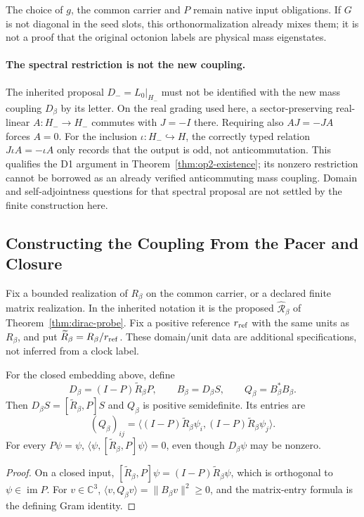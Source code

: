 The choice of $g$, the common carrier and $P$ remain native input
obligations. If $G$ is not diagonal in the seed slots, this
orthonormalization already mixes them; it is not a proof that the
original octonion labels are physical mass eigenstates.

\paragraph{The spectral restriction is not the new coupling.}
The inherited proposal $D_-=L_0|_{H_-}$ must not be identified with
the new mass coupling $D_\beta$ by its letter. On the real grading
used here, a sector-preserving real-linear $A:H_-\to H_-$ commutes
with $J=-I$ there. Requiring also $AJ=-JA$ forces $A=0$.
For the inclusion $\iota:H_-\hookrightarrow H$, the correctly typed
relation $J\iota A=-\iota A$ only records that the output is
odd, not anticommutation. This qualifies the D1 argument in
Theorem~\ref{thm:op2-existence}; its nonzero restriction cannot be
borrowed as an already verified anticommuting mass coupling.
Domain and self-adjointness questions for that spectral proposal
are not settled by the finite construction here.

\subsection{Constructing the Coupling From the Pacer and Closure}
\label{v480:generation-defect}

Fix a bounded realization of $R_\beta$ on the common carrier, or a
declared finite matrix realization. In the inherited notation it is
the proposed $\hat{\mathcal R}_\beta$ of
Theorem~\ref{thm:dirac-probe}. Fix a positive reference $r_{\rm ref}$
with the same units as $R_\beta$, and put
$\widetilde R_\beta=R_\beta/r_{\rm ref}$. These domain/unit data
are additional specifications, not inferred from a clock label.

\begin{proposition}
\label{v480:generation-defect-gram}
For the closed embedding above, define
\[
 D_\beta=(I-P)\widetilde R_\beta P,\qquad
 B_\beta=D_\beta S,\qquad Q_\beta=B_\beta^*B_\beta.
\]
Then $D_\beta S=[\widetilde R_\beta,P]S$ and
$Q_\beta$ is positive semidefinite. Its entries are
\[
 (Q_\beta)_{ij}
 =\langle (I-P)\widetilde R_\beta\psi_i,
                 (I-P)\widetilde R_\beta\psi_j\rangle.
\]
For every $P\psi=\psi$,
$\langle\psi,[\widetilde R_\beta,P]\psi\rangle=0$,
even though $D_\beta\psi$ may be nonzero.
\end{proposition}
\begin{proof}
On a closed input,
$[\widetilde R_\beta,P]\psi=(I-P)\widetilde R_\beta\psi$,
which is orthogonal to $\psi\in\operatorname{im}P$.
For $v\in\mathbb C^3$,
$\langle v,Q_\beta v\rangle=\|B_\beta v\|^2\geq0$,
and the matrix-entry formula is the defining Gram identity.
\end{proof}

